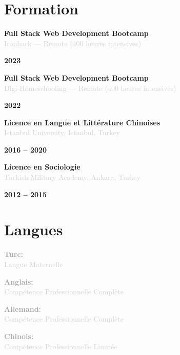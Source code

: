 \documentclass[10pt,a4paper]{article}
\newcommand{\Education}[3]{%
  \vspace{2pt}
  \noindent
  \begin{minipage}[t]{0.70\textwidth}
    {\normalsize\textbf{\color{darkgray}#1}} \\
    \textcolor{lightgray}{\small #2}
  \end{minipage}%
  \hfill
  \begin{minipage}[t]{0.28\textwidth}
    \raggedleft
    \textcolor{mediumgray}{\small\textbf{#3}}
  \end{minipage}
  \vspace{1pt}
}
\begin{document}
\section*{Formation}

\Education{Full Stack Web Development Bootcamp}{Ironhack — Remote (400 heures intensives)}{2023}

\Education{Full Stack Web Development Bootcamp}{Digi-Homeschooling — Remote (400 heures intensives)}{2022}

\Education{Licence en Langue et Littérature Chinoises}{Istanbul University, Istanbul, Turkey}{2016 -- 2020}

\Education{Licence en Sociologie}{Turkish Military Academy, Ankara, Turkey}{2012 -- 2015}

\section*{Langues}

\vspace{1pt}
\noindent
\begin{minipage}[t]{0.24\textwidth}
  \textcolor{darkgray}{\textbf{Turc:}} \\
  \textcolor{lightgray}{\small Langue Maternelle}
\end{minipage}%
\hfill
\begin{minipage}[t]{0.24\textwidth}
  \textcolor{darkgray}{\textbf{Anglais:}} \\
  \textcolor{lightgray}{\small Compétence Professionnelle Complète}
\end{minipage}%
\hfill
\begin{minipage}[t]{0.24\textwidth}
  \textcolor{darkgray}{\textbf{Allemand:}} \\
  \textcolor{lightgray}{\small Compétence Professionnelle Complète}
\end{minipage}%
\hfill
\begin{minipage}[t]{0.24\textwidth}
  \textcolor{darkgray}{\textbf{Chinois:}} \\
  \textcolor{lightgray}{\small Compétence Professionnelle Limitée}
\end{minipage}
\end{document}
